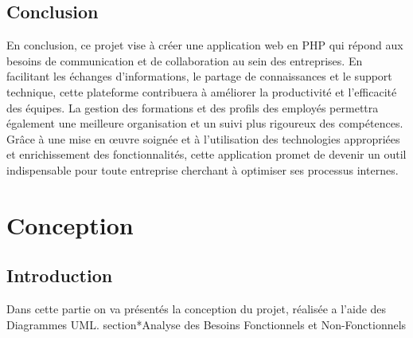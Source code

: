\documentclass{article}
\begin{document}
        \subsection{Conclusion}
            En conclusion, ce projet vise à créer une application web en PHP qui répond aux besoins de communication et de collaboration au sein des entreprises. En facilitant les échanges d'informations, le partage de connaissances et le support technique, cette plateforme contribuera à améliorer la productivité et l'efficacité des équipes. La gestion des formations et des profils des employés permettra également une meilleure organisation et un suivi plus rigoureux des compétences. Grâce à une mise en œuvre soignée et à l'utilisation des technologies appropriées et enrichissement des fonctionnalités, cette application promet de devenir un outil indispensable pour toute entreprise cherchant à optimiser ses processus internes.
    
    \section{Conception}
        \subsection{Introduction}
            Dans cette partie on va présentés la conception du projet, réalisée a l'aide des Diagrammes UML.
            section*{Analyse des Besoins Fonctionnels et Non-Fonctionnels}
\end{document}
